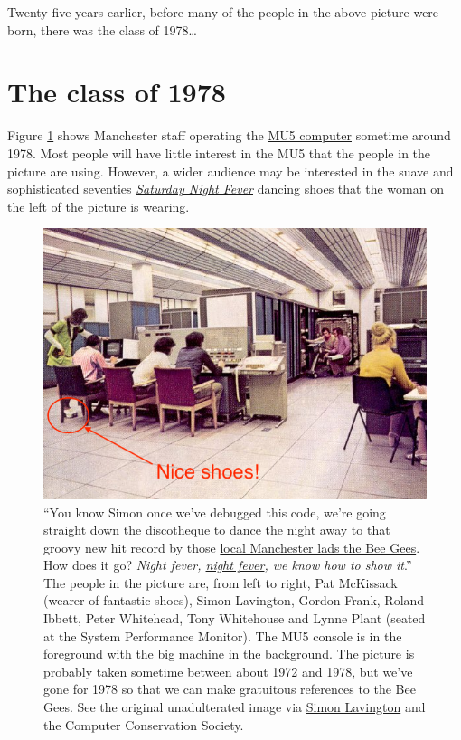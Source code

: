 \documentclass[
  12pt,
]{book}
\begin{document}
Twenty five years earlier, before many of the people in the above picture were born, there was the class of 1978\ldots{}

\hypertarget{y1978}{%
\section{The class of 1978}\label{y1978}}

Figure \ref{fig:mu5-fig} shows Manchester staff operating the \href{https://en.wikipedia.org/wiki/Manchester_computers\#MU5}{MU5 computer} sometime around 1978. Most people will have little interest in the MU5 that the people in the picture are using. However, a wider audience may be interested in the suave and sophisticated seventies \emph{\href{https://en.wikipedia.org/wiki/Saturday_Night_Fever}{Saturday Night Fever}} dancing shoes that the woman on the left of the picture is wearing. \citep{nightfever}

\begin{figure}

{\centering \includegraphics[width=0.99\linewidth]{images/classof1970something2} 

}

\caption{``You know Simon once we've debugged this code, we're going straight down the discotheque to dance the night away to that groovy new hit record by those \href{https://en.wikipedia.org/wiki/Bee_Gees}{local Manchester lads the Bee Gees}. How does it go? \emph{Night fever, \href{https://en.wikipedia.org/wiki/Night_Fever}{night fever}, we know how to show it}.'' The people in the picture are, from left to right, Pat McKissack (wearer of fantastic shoes), Simon Lavington, Gordon Frank, Roland Ibbett, Peter Whitehead, Tony Whitehouse and Lynne Plant (seated at the System Performance Monitor). The MU5 console is in the foreground with the big machine in the background. The picture is probably taken sometime between about 1972 and 1978, but we've gone for 1978 so that we can make gratuitous references to the Bee Gees. See the original unadulterated image via \href{http://www.computinghistory.org.uk/det/3638/Simon-Lavington/}{Simon Lavington} and the Computer Conservation Society. \citep{mu5}}\label{fig:mu5-fig}
\end{figure}
\end{document}
